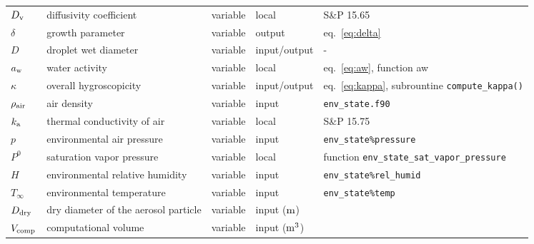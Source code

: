 \documentclass{article}
\begin{document}
\begin{tabular}{lp{4cm}clp{3cm}}
\hline
$D_{\rm v}$     & diffusivity coefficient   &  variable & local &  S\&P 15.65  \\
$\delta$  & growth parameter &  variable & output & eq.~\ref{eq:delta}\\
$D$     &  droplet wet diameter  & variable  & input/output &   -   \\
$a_{\rm w}$  & water activity  &variable & local & eq.~\ref{eq:aw},  function aw  \\
$\kappa$      &  overall hygroscopicity   &  variable & input/output  &  eq.~\ref{eq:kappa}, subrountine \verb+compute_kappa()+   \\
$ \rho_{\rm air}$    &  air density   &  variable  & input  &  \verb+env_state.f90+   \\
$k_{\rm a} $     & thermal conductivity of air    &  variable & local &   S\&P 15.75   \\
$p$     &  environmental air pressure &  variable  & input  &  \verb+env_state%pressure+ \\
$P^0$   & saturation vapor pressure &  variable & local &  function \verb+env_state_sat_vapor_pressure+  \\
$H$     &  environmental relative humidity  &  variable  & input  &  \verb+env_state%rel_humid+  \\
$T_{\infty}$     &  environmental temperature  &  variable  & input  &  \verb+env_state%temp+  \\
$D_{\rm dry}$       & dry diameter of the aerosol particle   &  variable  & input ($\rm m$) &    \\
$V_{\rm comp}$ & computational volume & variable & input ($\rm m^3$) & \\
\hline 
\end{tabular}
\end{document}
